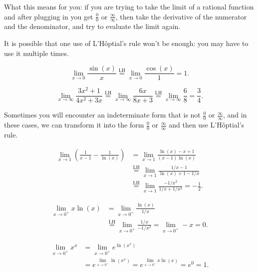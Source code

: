 What this means for you: if you are trying to take the limit of a rational function and after plugging in you get $\frac{0}{0}$ or $\frac{\infty}{\infty}$, then take the derivative of the numerator and the denominator, and try to evaluate the limit again.

It is possible that one use of L'H\^optial's rule won't be enough: you may have to use it multiple times.
\begin{exampleblock}
$$\lim_{x\to 0}\frac{\sin(x)}{x}\overset{\text{LH}}{=}\lim_{x\to 0}\frac{\cos(x)}{1}=1.$$
\end{exampleblock}
\begin{exampleblock}
$$\lim_{x\to \infty}\frac{3x^2+1}{4x^2+3x}\overset{\text{LH}}{=}\lim_{x\to\infty}\frac{6x}{8x+3}\overset{\text{LH}}{=}\lim_{x\to\infty}\frac{6}{8}=\frac{3}{4}.$$
\end{exampleblock}

Sometimes you will encounter an indeterminate form that is not $\frac00$ or $\frac\infty\infty$, and in these cases, we can transform it into the form $\frac00$ or $\frac\infty\infty$ and then use L'H\^optial's rule.
\begin{exampleblock}
$$\begin{aligned}
\lim_{x\to1}\left(\frac{1}{x-1}-\frac{1}{\ln(x)}\right)
&=\lim_{x\to1}\frac{\ln(x)-x+1}{(x-1)\ln(x)}\\
&\overset{\text{LH}}{=}\lim_{x\to1}\frac{1/x-1}{\ln(x)+1-1/x}\\
&\overset{\text{LH}}{=}\lim_{x\to1}\frac{-1/x^2}{1/x+1/x^2}=-\frac12.
\end{aligned}$$
\end{exampleblock}
\begin{exampleblock}
$$\begin{aligned}
\lim_{x\to0^+}x\ln(x)&=\lim_{x\to0^+}\frac{\ln(x)}{1/x}\\
&\overset{\text{LH}}{=}\lim_{x\to0^+}\frac{1/x}{-1/x^2}
=\lim_{x\to0^+}-x=0.
\end{aligned}$$
\end{exampleblock}
\begin{exampleblock}
$$\begin{aligned}
\lim_{x\to0^+}x^x
&=\lim_{x\to0^+}e^{\ln(x^x)}\\
&=e^{\displaystyle\lim_{x\to0^+}\ln(x^x)}
=e^{\displaystyle\lim_{x\to0^+}x\ln(x)}=e^0=1.
\end{aligned}$$
\end{exampleblock}

